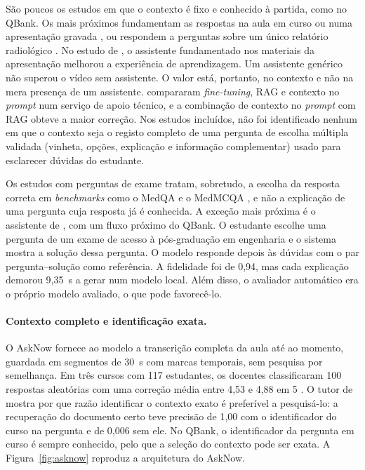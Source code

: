 São poucos os estudos em que o contexto é fixo e conhecido à partida, como no QBank. Os mais próximos fundamentam as respostas na aula em curso \parencite{liu2026asknow} ou numa apresentação gravada \parencite{xu2026echomind}, ou respondem a perguntas sobre um único relatório radiológico \parencite{hamidi2026large}. No estudo de \textcite{xu2026echomind}, o assistente fundamentado nos materiais da apresentação melhorou a experiência de aprendizagem. Um assistente genérico não superou o vídeo sem assistente. O valor está, portanto, no contexto e não na mera presença de um assistente. \textcite{zheng2026comparative} compararam \emph{fine-tuning}, \gls{RAG} e contexto no \emph{prompt} num serviço de apoio técnico, e a combinação de contexto no \emph{prompt} com \gls{RAG} obteve a maior correção. Nos estudos incluídos, não foi identificado nenhum em que o contexto seja o registo completo de uma pergunta de escolha múltipla validada (vinheta, opções, explicação e informação complementar) usado para esclarecer dúvidas do estudante.

Os estudos com perguntas de exame tratam, sobretudo, a escolha da resposta correta em \emph{benchmarks} como o MedQA e o MedMCQA \parencite{zhang2025meditrir,liu2026quality,xie2026when}, e não a explicação de uma pergunta cuja resposta já é conhecida. A exceção mais próxima é o assistente de \textcite{khan2025towards}, com um fluxo próximo do QBank. O estudante escolhe uma pergunta de um exame de acesso à pós-graduação em engenharia e o sistema mostra a solução dessa pergunta. O modelo responde depois às dúvidas com o par pergunta--solução como referência. A fidelidade foi de 0,94, mas cada explicação demorou 9,35~s a gerar num modelo local. Além disso, o avaliador automático era o próprio modelo avaliado, o que pode favorecê-lo.

\paragraph{Contexto completo e identificação exata.} O AskNow fornece ao modelo a transcrição completa da aula até ao momento, guardada em segmentos de 30~s com marcas temporais, sem pesquisa por semelhança. Em três cursos com 117 estudantes, os docentes classificaram 100 respostas aleatórias com uma correção média entre 4,53 e 4,88 em 5 \parencite{liu2026asknow}. O tutor de \textcite{wei2026cloud} mostra por que razão identificar o contexto exato é preferível a pesquisá-lo: a recuperação do documento certo teve precisão de 1,00 com o identificador do curso na pergunta e de 0,006 sem ele. No QBank, o identificador da pergunta em curso é sempre conhecido, pelo que a seleção do contexto pode ser exata. A Figura~\ref{fig:asknow} reproduz a arquitetura do AskNow.

